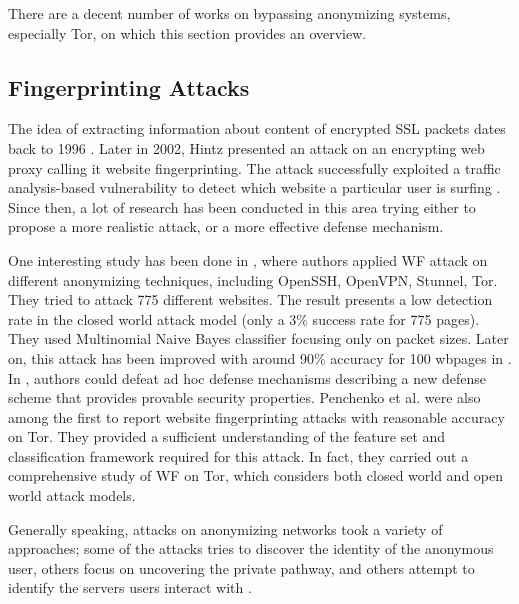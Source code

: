 
There are a decent number of works on bypassing anonymizing systems, especially Tor, on which this section provides an overview.

\subsection{Fingerprinting Attacks}
The idea of extracting information about content of encrypted SSL packets dates back to 1996 \cite{wagner96}. Later in 2002, Hintz presented an attack on an encrypting web proxy calling it website fingerprinting. The attack successfully exploited a traffic analysis-based vulnerability to detect which website a particular user is surfing \cite{hintz2003}. Since then, a lot of research has been conducted in this area trying either to propose a more realistic attack, or a more effective defense mechanism. 

One interesting study has been done in \cite{herrmann2009}, where authors applied WF attack on different anonymizing techniques, including OpenSSH, OpenVPN, Stunnel, Tor. They tried to attack 775 different websites. The result presents a low detection rate in the closed world attack model (only a 3\% success rate for 775 pages). They used Multinomial Naive Bayes classifier focusing only on packet sizes. Later on, this attack has been improved with around 90\% accuracy for 100 wbpages in \cite{wang2013improved, cai2012touching}. In \cite{cai2012touching}, authors could defeat ad hoc defense mechanisms describing a new defense scheme that provides provable security properties. Penchenko et al. \cite{panchenko11} were also among the first to report website fingerprinting attacks with reasonable accuracy on Tor. They provided a sufficient understanding of the feature set and classification framework required for this attack. In fact, they carried out a comprehensive study of WF on Tor, which considers both closed world and open world attack models.  

Generally speaking, attacks on anonymizing networks took a variety of approaches; some of the attacks tries to discover the identity of the anonymous user, others focus on uncovering the private pathway, and others attempt to identify the servers users interact with  \cite{cai2012touching}.

